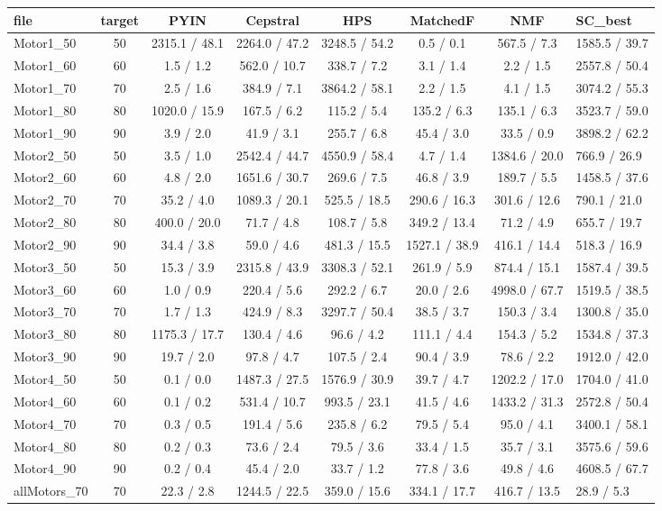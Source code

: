 \begin{tabular}{lcccccc}
\toprule
file & target & PYIN & Cepstral & HPS & MatchedF & NMF & SC\_best \\
\midrule
Motor1\_50 & 50 & 2315.1 / 48.1 & 2264.0 / 47.2 & 3248.5 / 54.2 & 0.5 / 0.1 & 567.5 / 7.3 & 1585.5 / 39.7 \\
Motor1\_60 & 60 & 1.5 / 1.2 & 562.0 / 10.7 & 338.7 / 7.2 & 3.1 / 1.4 & 2.2 / 1.5 & 2557.8 / 50.4 \\
Motor1\_70 & 70 & 2.5 / 1.6 & 384.9 / 7.1 & 3864.2 / 58.1 & 2.2 / 1.5 & 4.1 / 1.5 & 3074.2 / 55.3 \\
Motor1\_80 & 80 & 1020.0 / 15.9 & 167.5 / 6.2 & 115.2 / 5.4 & 135.2 / 6.3 & 135.1 / 6.3 & 3523.7 / 59.0 \\
Motor1\_90 & 90 & 3.9 / 2.0 & 41.9 / 3.1 & 255.7 / 6.8 & 45.4 / 3.0 & 33.5 / 0.9 & 3898.2 / 62.2 \\
Motor2\_50 & 50 & 3.5 / 1.0 & 2542.4 / 44.7 & 4550.9 / 58.4 & 4.7 / 1.4 & 1384.6 / 20.0 & 766.9 / 26.9 \\
Motor2\_60 & 60 & 4.8 / 2.0 & 1651.6 / 30.7 & 269.6 / 7.5 & 46.8 / 3.9 & 189.7 / 5.5 & 1458.5 / 37.6 \\
Motor2\_70 & 70 & 35.2 / 4.0 & 1089.3 / 20.1 & 525.5 / 18.5 & 290.6 / 16.3 & 301.6 / 12.6 & 790.1 / 21.0 \\
Motor2\_80 & 80 & 400.0 / 20.0 & 71.7 / 4.8 & 108.7 / 5.8 & 349.2 / 13.4 & 71.2 / 4.9 & 655.7 / 19.7 \\
Motor2\_90 & 90 & 34.4 / 3.8 & 59.0 / 4.6 & 481.3 / 15.5 & 1527.1 / 38.9 & 416.1 / 14.4 & 518.3 / 16.9 \\
Motor3\_50 & 50 & 15.3 / 3.9 & 2315.8 / 43.9 & 3308.3 / 52.1 & 261.9 / 5.9 & 874.4 / 15.1 & 1587.4 / 39.5 \\
Motor3\_60 & 60 & 1.0 / 0.9 & 220.4 / 5.6 & 292.2 / 6.7 & 20.0 / 2.6 & 4998.0 / 67.7 & 1519.5 / 38.5 \\
Motor3\_70 & 70 & 1.7 / 1.3 & 424.9 / 8.3 & 3297.7 / 50.4 & 38.5 / 3.7 & 150.3 / 3.4 & 1300.8 / 35.0 \\
Motor3\_80 & 80 & 1175.3 / 17.7 & 130.4 / 4.6 & 96.6 / 4.2 & 111.1 / 4.4 & 154.3 / 5.2 & 1534.8 / 37.3 \\
Motor3\_90 & 90 & 19.7 / 2.0 & 97.8 / 4.7 & 107.5 / 2.4 & 90.4 / 3.9 & 78.6 / 2.2 & 1912.0 / 42.0 \\
Motor4\_50 & 50 & 0.1 / 0.0 & 1487.3 / 27.5 & 1576.9 / 30.9 & 39.7 / 4.7 & 1202.2 / 17.0 & 1704.0 / 41.0 \\
Motor4\_60 & 60 & 0.1 / 0.2 & 531.4 / 10.7 & 993.5 / 23.1 & 41.5 / 4.6 & 1433.2 / 31.3 & 2572.8 / 50.4 \\
Motor4\_70 & 70 & 0.3 / 0.5 & 191.4 / 5.6 & 235.8 / 6.2 & 79.5 / 5.4 & 95.0 / 4.1 & 3400.1 / 58.1 \\
Motor4\_80 & 80 & 0.2 / 0.3 & 73.6 / 2.4 & 79.5 / 3.6 & 33.4 / 1.5 & 35.7 / 3.1 & 3575.6 / 59.6 \\
Motor4\_90 & 90 & 0.2 / 0.4 & 45.4 / 2.0 & 33.7 / 1.2 & 77.8 / 3.6 & 49.8 / 4.6 & 4608.5 / 67.7 \\
allMotors\_70 & 70 & 22.3 / 2.8 & 1244.5 / 22.5 & 359.0 / 15.6 & 334.1 / 17.7 & 416.7 / 13.5 & 28.9 / 5.3 \\
\bottomrule
\end{tabular}

